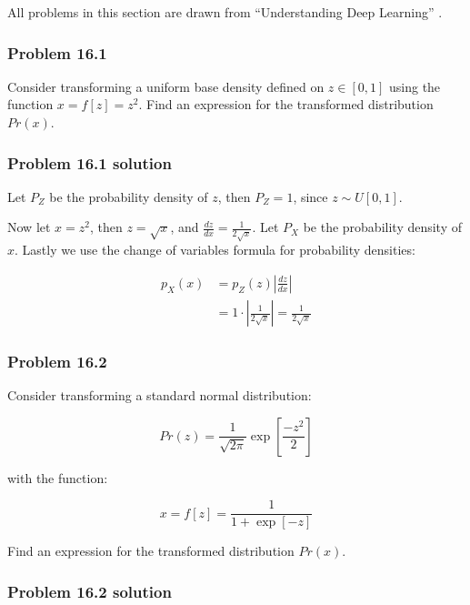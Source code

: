 \documentclass[
10pt, %
a4paper, %
oneside, %
headinclude,footinclude, %
BCOR5mm, %
]{scrartcl}
\begin{document}
All problems in this section are drawn from ``Understanding Deep Learning'' \citet{prince2023understanding}.

\subsubsection*{Problem 16.1}

Consider transforming a uniform base density defined on $z\in[0,1]$ using the function $x = f[z] = z^2$. Find an expression for the transformed distribution $Pr(x)$.

\subsubsection*{Problem 16.1 solution}

Let $P_Z$ be the probability density of $z$, then $P_Z = 1$, since $z\sim U[0,1]$.

Now let $x = z^2$, then $z = \sqrt{x}$, and $\frac{dz}{dx} = \frac{1}{2\sqrt{x}}$. Let $P_X$ be the probability density of $x$. Lastly we use the change of variables formula for probability densities:

\begin{align*}
  p_X(x) &= p_Z(z) \left|\frac{dz}{dx}\right| \\
  &= 1 \cdot \left| \frac{1}{2 \sqrt{x}} \right| = \frac{1}{2\sqrt{x}}
\end{align*}

\subsubsection*{Problem 16.2}

Consider transforming a standard normal distribution:

\begin{equation*}
  Pr(z) = \frac{1}{\sqrt{2\pi}} \exp \left[\frac{-z^2}{2}\right]
\end{equation*}

with the function:

\begin{equation*}
  x = f[z] = \frac{1}{1 + \exp[-z]}
\end{equation*}

Find an expression for the transformed distribution $Pr(x)$.

\subsubsection*{Problem 16.2 solution}
\end{document}
